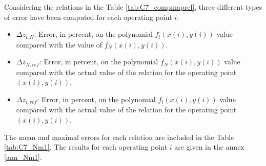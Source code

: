 Considering the relations in the Table \ref{tab:C7_compmaprel}, three different types of error have been computed for each operating point $i$:

\begin{itemize}
    \item $\Delta z_{i,N}$: Error, in percent, on the polynomial $f_i\left(x(i),y(i)\right)$ value compared with the value of $f_N\left(x(i),y(i)\right)$.
    \item $\Delta z_{N,ref}$: Error, in percent, on the polynomial $f_N\left(x(i),y(i)\right)$ value compared with the actual value of the relation for the operating point $\left(x(i),y(i)\right)$.
    \item $\Delta z_{i,ref}$: Error, in percent, on the polynomial $f_i\left(x(i),y(i)\right)$ value compared with the actual value of the relation for the operating point $\left(x(i),y(i)\right)$.
\end{itemize}

The mean and maximal errors for each relation are included in the Table \ref{tab:C7_Nm1}. The results for each operating point $i$ are given in the annex \ref{ann_Nm1}.

